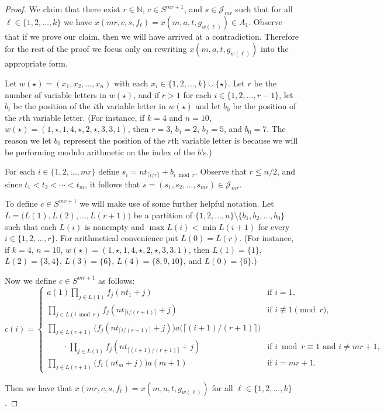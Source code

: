 \documentclass[12pt,showtrims]{memoir}
\theoremstyle{plain}
\theoremstyle{definition}
\newcommand{\bbN}{\mathbb{N}}
\newcommand{\calJ}{\mathcal{J}}
\begin{document}
\begin{proof}
  We claim that there exist $r \in \bbN$, $c \in S^{mr+1}$, and $s \in \calJ_{mr}$ such that for all $\ell \in \{1, 2, \ldots, k\}$ we have $x(mr, c, s, f_\ell) = x(m, a, t, g_{w(\ell)}) \in A_1$. 
  Observe that if we prove our claim, then we will have arrived at a contradiction. 
  Therefore for the rest of the proof we focus only on rewriting $x(m, a, t, g_{w(\ell)})$ into the appropriate form.

  Let $w(\star) = (x_1, x_2, \ldots, x_n)$ with each $x_i \in \{1, 2, \ldots, k\} \cup \{\star\}$. 
  Let $r$ be the number of variable letters in $w(\star)$, and if $r > 1$ for each $i \in \{1, 2, \ldots, r-1\}$, let $b_i$ be the position of the \mbox{$i$th} variable letter in $w(\star)$ and let $b_0$ be the position of the \mbox{$r$th} variable letter.
  (For instance, if $k = 4$ and $n = 10$, $w(\star) = (1, \star, 1, 4, \star, 2, \star, 3, 3, 1)$, then $r = 3$, $b_1 = 2$, $b_2 = 5$, and $b_0 = 7$.
  The reason we let $b_0$ represent the position of the \mbox{$r$th} variable letter is because we will be performing modulo arithmetic on the index of the $b$'s.)

  For each $i \in \{1, 2, \ldots, mr\}$ define $s_i = nt_{\lceil i/r \rceil} + b_{i \bmod r}$.
  Observe that $r \le n/2$, and since $t_1 < t_2 < \cdots < t_m$, it follows that $s = (s_1, s_2, \ldots, s_{mr}) \in \calJ_{mr}$.

  To define $c \in S^{mr+1}$ we will make use of some further helpful notation. 
  Let $L = \bigl( L(1), L(2), \ldots, L(r+1) \bigr)$ be a partition of $\{1, 2, \ldots, n\} \setminus \{b_1, b_2, \ldots, b_0\}$ such that each $L(i)$ is nonempty and $\max L(i) < \min L(i+1)$ for every $i \in \{1, 2, \ldots, r\}$. 
  For arithmetical convenience put $L(0) = L(r)$. 
  (For instance, if $k = 4$, $n = 10$, $w(\star) = (1, \star, 1, 4, \star, 2, \star, 3, 3, 1)$, then $L(1) = \{1\}$, $L(2) = \{3,4\}$, $L(3) = \{6\}$, $L(4) = \{8, 9, 10\}$, and $L(0) = \{6\}$.)

  Now we define $c \in S^{mr+1}$ as follows:
  \[
    c(i) = 
    \begin{cases}
      a(1)\prod_{j \in L(1)} f_j(nt_1 + j) & \mbox{if $i = 1$,} \\
      \prod_{j \in L(i \bmod r)}  f_j(nt_{\lceil i/(r+1) \rceil} + j) & \mbox{if $i \not\equiv 1 \pmod r$, }\\
      \prod_{j \in L(r+1)} \bigl( f_j(nt_{\lceil i/(r+1) \rceil} + j) \bigr) a\bigl( \lceil (i+1)/(r+1) \rceil \bigr) & \\
      \hspace{2em} \cdot\prod_{j \in L(1)} f_j(nt_{\lceil (i+1)/(r+1) \rceil} + j) & \mbox{if $i \bmod r \equiv 1$ and $i \ne mr +1$, }\\
      \prod_{j \in L(r+1)} \bigr( f_i(nt_m + j) \bigr) a(m+1) & \mbox{if $i = mr + 1$.}
    \end{cases}
  \]

  Then we have that $x(mr, c, s, f_\ell) = x(m, a, t, g_{w(\ell)})$ for all $\ell \in \{1, 2, \ldots, k\}$.
\end{proof}
\end{document}
